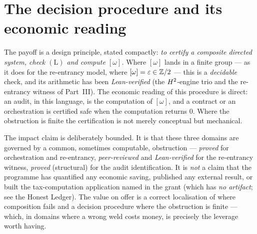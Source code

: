 \section{The decision procedure and its economic reading}
\label{sec:econ-procedure}

The payoff is a design principle, stated compactly: \emph{to certify a composite directed
system, check $(\mathrm{L})$ and compute $[\omega]$.} Where $[\omega]$ lands in a finite
group --- as it does for the re-entrancy model, where $[\omega]=\varepsilon\in\mathbb{Z}/2$ --- this
is a \emph{decidable} check, and its arithmetic has been \emph{Lean-verified} (the
$H^2$-engine trio and the re-entrancy witness of Part~III). The economic reading of this
procedure is direct: an audit, in this language, is the computation of $[\omega]$, and a
contract or an orchestration is certified safe when the computation returns $0$. Where the
obstruction is finite the certification is not merely conceptual but mechanical.

\begin{remark}
The impact claim is deliberately bounded. It is that these three domains are governed by a
common, sometimes computable, obstruction --- \emph{proved} for orchestration and
re-entrancy, \emph{peer-reviewed} and \emph{Lean-verified} for the re-entrancy witness,
\emph{proved} (structural) for the audit identification. It is \emph{not} a claim that the
programme has quantified any economic saving, published any external result, or built the
tax-computation application named in the grant (which has \emph{no artifact}; see the Honest
Ledger). The value on offer is a correct localisation of where composition fails and a
decision procedure where the obstruction is finite --- which, in domains where a wrong weld
costs money, is precisely the leverage worth having.
\end{remark}
